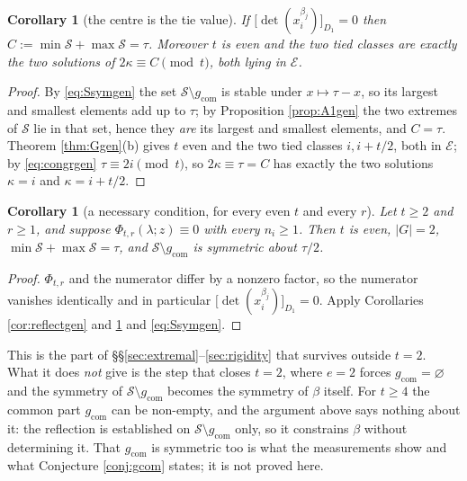 \documentclass[11pt,reqno]{amsart}
\theoremstyle{plain}
\newtheorem{corollary}[theorem]{Corollary}
\theoremstyle{definition}
\begin{document}
\begin{corollary}[the centre is the tie value]\label{cor:Ctaugen}
If $\bigl[\det(x_i^{\beta_j})\bigr]_{D_1}=0$ then
$C:=\min\mathcal{S}+\max\mathcal{S}=\tau$. Moreover $t$ is even and the two tied classes are exactly
the two solutions of $2\kappa\equiv C\pmod t$, both lying in $\mathcal{E}$.
\end{corollary}

\begin{proof}
By \eqref{eq:Ssymgen} the set $\mathcal{S}\setminus g_{\mathrm{com}}$ is stable under
$x\mapsto\tau-x$, so its largest and smallest elements add up to $\tau$; by Proposition
\ref{prop:A1gen} the two extremes of $\mathcal{S}$ lie in that set, hence they \emph{are} its largest
and smallest elements, and $C=\tau$. Theorem \ref{thm:Ggen}(b) gives $t$ even and the two tied classes
$i,i+t/2$, both in $\mathcal{E}$; by \eqref{eq:congrgen} $\tau\equiv2i\pmod t$, so
$2\kappa\equiv\tau=C$ has exactly the two solutions $\kappa=i$ and $\kappa=i+t/2$.
\end{proof}

\begin{corollary}[a necessary condition, for every even $t$ and every $r$]\label{cor:necgen}
Let $t\ge2$ and $r\ge1$, and suppose $\Phi_{t,r}(\lambda;z)\equiv0$ with every $n_i\ge1$. Then $t$
is even, $|G|=2$, $\min\mathcal{S}+\max\mathcal{S}=\tau$, and $\mathcal{S}\setminus g_{\mathrm{com}}$
is symmetric about $\tau/2$.
\end{corollary}

\begin{proof}
$\Phi_{t,r}$ and the numerator differ by a nonzero factor, so the numerator vanishes identically and
in particular $\bigl[\det(x_i^{\beta_j})\bigr]_{D_1}=0$. Apply Corollaries \ref{cor:reflectgen} and
\ref{cor:Ctaugen} and \eqref{eq:Ssymgen}.
\end{proof}

\noindent This is the part of \S\S\ref{sec:extremal}--\ref{sec:rigidity} that survives outside
$t=2$. What it does \emph{not} give is the step that closes $t=2$, where $e=2$ forces
$g_{\mathrm{com}}=\varnothing$ and the symmetry of $\mathcal{S}\setminus g_{\mathrm{com}}$ becomes
the symmetry of $\beta$ itself. For $t\ge4$ the common part $g_{\mathrm{com}}$ can be non-empty, and
the argument above says nothing about it: the reflection is established on
$\mathcal{S}\setminus g_{\mathrm{com}}$ only, so it constrains $\beta$ without determining it. That
$g_{\mathrm{com}}$ is symmetric too is what the measurements show and what Conjecture
\ref{conj:gcom} states; it is not proved here.
\end{document}
